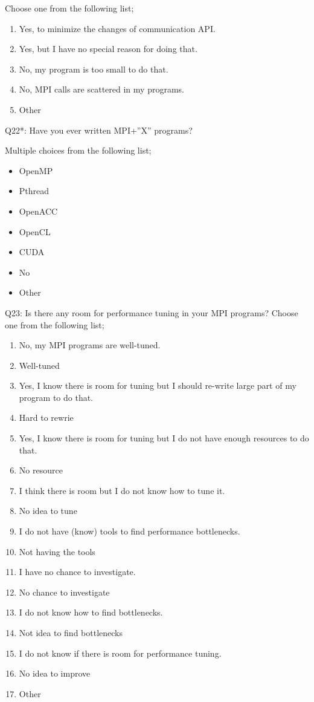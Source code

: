 \begin{description}
Choose one from the following list;
\begin{enumerate}
\item Yes, to minimize the changes of communication API.
\item Yes, but I have no special reason for doing that.
\item No, my program is too small to do that.
\item No, MPI calls are scattered in my programs.
\item Other
\end{enumerate}

\item{Q22*:} Have you ever written MPI+”X” programs?

Multiple choices from the following list;
\begin{itemize}
\item OpenMP
\item Pthread
\item OpenACC
\item OpenCL
\item CUDA
\item No
\item Other
\end{itemize}

\item{Q23:} Is there any room for performance tuning in your MPI programs?
Choose one from the following list;
\begin{enumerate}
\item No, my MPI programs are well-tuned.
\item Well-tuned
\item Yes, I know there is room for tuning but I should re-write large
part of my program to do that.
\item Hard to rewrie
\item Yes, I know there is room for tuning but I do not have enough resources to do that.
\item No resource
\item I think there is room but I do not know how to tune it.
\item No idea to tune
\item I do not have (know) tools to find performance bottlenecks.
\item Not having the tools
\item I have no chance to investigate.
\item No chance to investigate
\item I do not know how to find bottlenecks.
\item Not idea to find bottlenecks
\item I do not know if there is room for performance tuning.
\item No idea to improve
\item Other
\end{enumerate}


\end{description}
